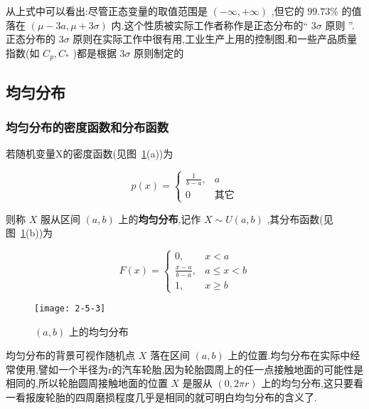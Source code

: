 从上式中可以看出:尽管正态变量的取值范围是 $ (-\infty,+\infty) $ ,但它的 $ 99.73\% $ 的值落在 $ (\mu-3 a, \mu+3 \sigma) $ 内.这个性质被实际工作者称作是正态分布的“ $ 3\sigma $ 原则 ”.正态分布的 $ 3\sigma $ 原则在实际工作中很有用,工业生产上用的控制图,和一些产品质量指数(如 $ C_{p}, C_{*} $ )都是根据 $ 3\sigma $ 原则制定的


\subsection{均匀分布}\label{ssec:2.5.2}

\subsubsection{均匀分布的密度函数和分布函数}

若随机变量X的密度函数(见图~\ref{fig:2.5.3}(a))为

\begin{equation}
p(x)=\left\{
\begin{array}{ll}
{\frac{1}{b-a},} & {a}        \\ 
{0}              &{\text{其它}}
\end{array}
\right. \label{eq:2.5.6}
\end{equation}

则称 $ X $ 服从区间 $ (a,b) $ 上的\textbf{均匀分布},记作 $ X \sim U(a, b) $ ,其分布函数(见图~\ref{fig:2.5.3}(b))为

\begin{equation}
F(x)=\left\{
\begin{array}{ll}
{0,} & {x<a} \\ 
{\frac{x-a}{b-a},} & {a \leqslant x<b} \\ 
{1,} & {x \geqslant b}
\end{array}
\right. \label{eq:2.5.7}
\end{equation}

\begin{figure}
	\centering
	\texttt{[image: 2-5-3]}
	\caption{ $ (a,b) $ 上的均匀分布}
	\label{fig:2.5.3}
\end{figure}

均匀分布的背景可视作随机点 $ X $ 落在区间 $ (a,b) $ 上的位置.均匀分布在实际中经常使用,譬如一个半径为r的汽车轮胎,因为轮胎圆周上的任一点接触地面的可能性是相同的,所以轮胎圆周接触地面的位置 $ X $ 是服从 $ (0,2 \pi r) $ 上的均匀分布,这只要看一看报废轮胎的四周磨损程度几乎是相同的就可明白均匀分布的含义了.

